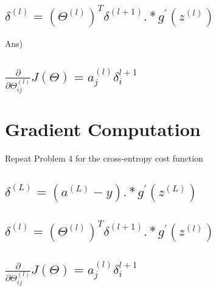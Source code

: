 \documentclass[12pt]{article}%
\begin{document}
\subsection{$\delta^{(l)} = (\Theta^{(l)})^{T} \delta^{(l+1)}.*g^{'}(z^{(l)})$}
Ans) 

\subsection{$\frac{\partial}{\partial \Theta_{ij}^{(l)}} J(\Theta) = a_{j}^{(l)} \delta_{i}^{l+1}$}

\section{Gradient Computation}
Repeat Problem 4 for the cross-entropy cost function
\subsection{$\delta^{(L)} = (a^{(L)} - y).*g^{'}(z^{(L)})$}
\subsection{$\delta^{(l)} = (\Theta^{(l)})^{T} \delta^{(l+1)}.*g^{'}(z^{(l)})$}
\subsection{$\frac{\partial}{\partial \Theta_{ij}^{(l)}} J(\Theta) = a_{j}^{(l)} \delta_{i}^{l+1}$}
\end{document}
